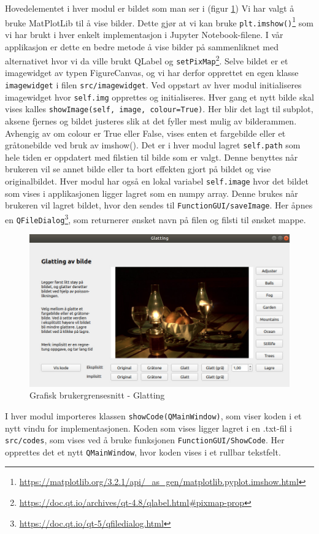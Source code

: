 Hovedelementet i hver modul er bildet som man ser i (figur \ref{fig:guiexample}) Vi har valgt å bruke MatPlotLib til å vise bilder. Dette gjør at vi kan bruke \texttt{plt.imshow()}\footnote{\url{https://matplotlib.org/3.2.1/api/_as_gen/matplotlib.pyplot.imshow.html}} som vi har brukt i hver enkelt implementasjon i Jupyter Notebook-filene. I vår applikasjon er dette en bedre metode å vise bilder på sammenliknet med alternativet hvor vi da ville brukt QLabel og \texttt{setPixMap}\footnote{\url{https://doc.qt.io/archives/qt-4.8/qlabel.html#pixmap-prop}}. Selve bildet er et imagewidget av typen FigureCanvas, og vi har derfor opprettet en egen klasse \texttt {imagewidget} i filen \texttt{src/imagewidget}. Ved oppstart av hver modul initialiseres imagewidget hvor \texttt{self.img} opprettes og initialiseres. Hver gang et nytt bilde skal vises kalles \texttt{showImage(self, image, colour=True)}. Her blir det lagt til subplot, aksene fjernes og bildet justeres slik at det fyller mest mulig av bilderammen. Avhengig av om colour er True eller False, vises enten et fargebilde eller et gråtonebilde ved bruk av imshow(). Det er i hver modul lagret \texttt{self.path} som hele tiden er oppdatert med filstien til bilde som er valgt. Denne benyttes når brukeren vil se annet bilde eller ta bort effekten gjort på bildet og vise originalbildet. Hver modul har også en lokal variabel \texttt{self.image} hvor det bildet som vises i applikasjonen ligger lagret som en numpy array. Denne brukes når brukeren vil lagret bildet, hvor den sendes til \texttt{FunctionGUI/saveImage}. Her åpnes en \texttt{QFileDialog}\footnote{\url{https://doc.qt.io/qt-5/qfiledialog.html}}, som returnerer ønsket navn på filen og filsti til ønsket mappe.

\begin{figure}
\begin{center}
    \includegraphics[width=0.5\columnwidth]{bilder/Gui/guiexample.jpg}
     \caption{Grafisk brukergrensesnitt - Glatting \label{fig:guiexample}}
\end{center}
\end{figure}

I hver modul importeres klassen \texttt{showCode(QMainWindow)}, som viser koden i et nytt vindu for implementasjonen. Koden som vises ligger lagret i en .txt-fil i \texttt{src/codes}, som vises ved å bruke funksjonen \texttt{FunctionGUI/ShowCode}. Her opprettes det et nytt \texttt{QMainWindow}, hvor koden vises i et rullbar tekstfelt. 

